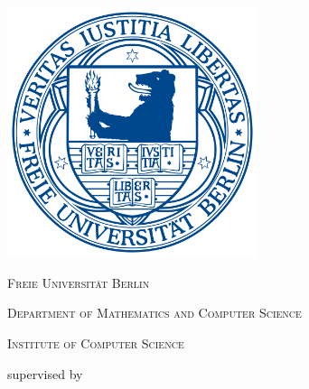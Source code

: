 
\thispagestyle{empty}
\hypersetup{pageanchor=false}
\begin{titlepage}
	\centering
	\vspace{2cm}
	{\textbf{\@subject}}
	\vspace{0.5cm}

	{\textbf{\huge \@title}}
    
	{\large \@author}
	\vspace{0.5cm}

	\includegraphics[width=0.55\textwidth]{images/2000px-Fub_siegel.png}

	{\scshape\LARGE Freie Universität Berlin}
    
	{\scshape\large Department of Mathematics and Computer Science}
    
	\vspace{-0.4cm}
	{\scshape\large Institute of Computer Science}
	\vspace{0.5cm}

    

    \vspace{0.8cm}

	supervised by
    
    \vspace{-0.4cm}
	\mysupervisor
    
    \vspace{-0.4cm}
    \mysecondsupervisor
	\vfill

	{\large \@date}

\hypersetup{pageanchor=true}
\end{titlepage}
